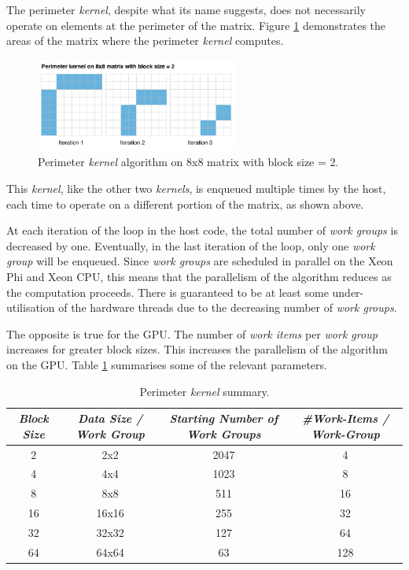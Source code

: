 \par{The perimeter \emph{kernel}, despite what its name suggests, does not 
    necessarily operate on elements at the perimeter of the matrix. 
    Figure \ref{PerimeterKernel2} demonstrates the areas of the matrix where the 
    perimeter \emph{kernel} computes.}

\begin{figure}[!h]
    \centering
    \includegraphics[width=0.6\textwidth]{figures/PerimeterKernel2.png}
    \caption{Perimeter \emph{kernel} algorithm on 8x8 matrix with block size = 2.}
    \label{PerimeterKernel2}
\end{figure}

\par{This \emph{kernel}, like the other two \emph{kernels}, is enqueued multiple times by 
    the host, each time to operate on a different portion of the matrix, 
    as shown above.}

\par{At each iteration of the loop in the host code, the total number of 
    \emph{work groups} is decreased by one. Eventually, in the last iteration of 
    the loop, only one \emph{work group} will be enqueued. Since \emph{work groups} are 
    scheduled in parallel on the Xeon Phi and Xeon CPU, this means that the 
    parallelism of the algorithm reduces as the computation proceeds. 
    There is guaranteed to be at least some under-utilisation of the hardware 
    threads due to the decreasing number of \emph{work groups}.}

\par{The opposite is true for the GPU. The number of \emph{work items} per 
    \emph{work group} increases for greater block sizes. This increases the 
    parallelism of the algorithm on the GPU. Table \ref{tab:lu2} summarises some 
    of the relevant parameters.}

\begin{table}[!h]
    \centering
    \begin{tabular}{| c | c | c | c |}
    \hline
    \emph{Block Size} & \emph{Data Size / Work Group} & 
    \emph{Starting Number of Work Groups} & 
    \emph{\#Work-Items / Work-Group} \\ \hline
    2 & 2x2 & 2047 & 4 \\ \hline
    4 & 4x4 & 1023 & 8 \\ \hline
    8 & 8x8 & 511 & 16 \\ \hline
    16 & 16x16 & 255 & 32 \\ \hline
    32 & 32x32 & 127 & 64 \\ \hline
    64 & 64x64 & 63 & 128 \\ \hline
    \end{tabular}
    \caption{Perimeter \emph{kernel} summary.}
    \label{tab:lu2}
\end{table}

